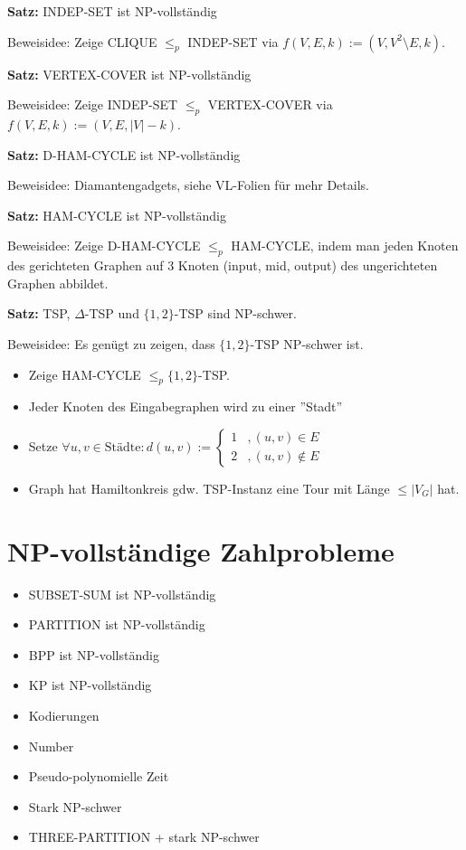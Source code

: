 \documentclass[a4paper,graphics,11pt]{article}
\begin{document}
\strut

\textbf{Satz:} INDEP-SET ist \textsf{NP}-vollständig

Beweisidee: Zeige CLIQUE $\leq_p$ INDEP-SET via $f(V,E,k) := (V,V^2 \setminus E, k)$.

\strut

\textbf{Satz:} VERTEX-COVER ist \textsf{NP}-vollständig

Beweisidee: Zeige INDEP-SET $\leq_p$ VERTEX-COVER via $f(V,E,k) := (V,E,|V|-k)$.

\strut

\textbf{Satz:} D-HAM-CYCLE ist \textsf{NP}-vollständig

Beweisidee: Diamantengadgets, siehe VL-Folien für mehr Details.

\strut

\textbf{Satz:} HAM-CYCLE ist \textsf{NP}-vollständig

Beweisidee: Zeige D-HAM-CYCLE $\leq_p$ HAM-CYCLE, indem man jeden Knoten
des gerichteten Graphen auf 3 Knoten (input, mid, output) des ungerichteten Graphen abbildet.

\newpage

\textbf{Satz:} TSP, $\Delta$-TSP und $\{1,2\}$-TSP sind \textsf{NP}-schwer.

Beweisidee: Es genügt zu zeigen, dass $\{1,2\}$-TSP \textsf{NP}-schwer ist. 
\begin{itemize}
    \item Zeige HAM-CYCLE $\leq_p \{1,2\}$-TSP.
    \item Jeder Knoten des Eingabegraphen wird zu einer ''Stadt''
    \item Setze $\forall u,v \in \text{Städte}: d(u,v) := \begin{cases}1 &, (u,v) \in E\\ 2 &, (u,v) \notin E\end{cases}$
    \item Graph hat Hamiltonkreis gdw. TSP-Instanz eine Tour mit Länge $\leq |V_G|$ hat.
\end{itemize}



\newpage



\section{\textsf{NP}-vollständige Zahlprobleme}

\begin{itemize}
    \item SUBSET-SUM ist \textsf{NP}-vollständig
    \item PARTITION ist \textsf{NP}-vollständig
    \item BPP ist \textsf{NP}-vollständig
    \item KP ist \textsf{NP}-vollständig
    \item Kodierungen
    \item Number
    \item Pseudo-polynomielle Zeit
    \item Stark \textsf{NP}-schwer
    \item THREE-PARTITION + stark \textsf{NP}-schwer
\end{itemize}
\end{document}
